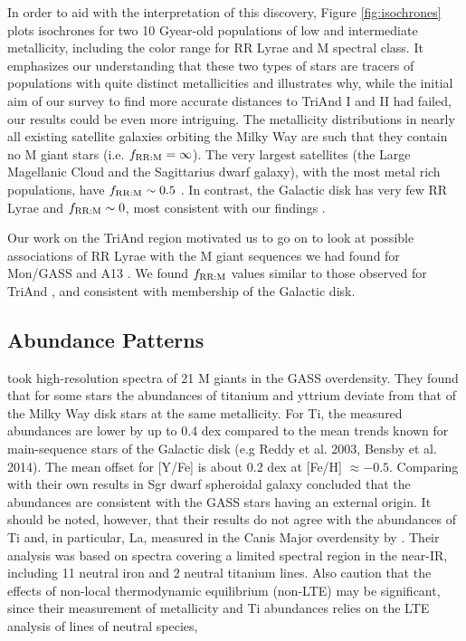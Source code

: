 \documentclass[galaxies,article,submit,moreauthors,pdftex,10pt,a4paper]{mdpi}
\begin{document}
In order to aid with the interpretation of this discovery, Figure \ref{fig:isochrones} plots isochrones for two 10 Gyear-old populations of low and intermediate metallicity, including the color range for RR Lyrae and M spectral class.
It emphasizes our understanding that these two types of stars are tracers of populations with quite distinct metallicities and illustrates why, while the initial aim of our survey to find more accurate distances to TriAnd I and II had failed, our results could be even more intriguing.
The metallicity distributions in nearly all existing satellite galaxies orbiting the Milky Way \citep[e.g.][]{kirby11} are such that they contain no M giant stars (i.e. $f_{\rm RR:M} = \infty$).
The very largest satellites (the Large Magellanic Cloud and the Sagittarius dwarf galaxy), with the most metal rich populations, have $f_{\rm RR:M}\sim 0.5$ \citep{pricewhelan15}.
In contrast, the Galactic disk has very few RR Lyrae and  $f_{\rm RR:M} \sim 0$, most consistent with our findings \citep{amrose01}.

Our work on the TriAnd region motivated us to go on to look at possible associations of RR Lyrae with the M giant sequences we had found for Mon/GASS and A13  \cite{sheffield17}.
We found $f_{\rm RR:M}$ values similar to those observed for TriAnd , and consistent with membership of the Galactic disk.


\subsection{Abundance Patterns}

\cite{chou2010b} took high-resolution spectra of 21 M giants in the GASS overdensity. They found that for some stars the abundances of titanium and yttrium deviate from that of the Milky Way disk stars at the same metallicity.  For Ti, the measured abundances are lower by up to 0.4 dex compared to the mean trends known for main-sequence stars of the Galactic disk (e.g Reddy et al. 2003, Bensby et al. 2014). The mean offset for [Y/Fe] is about 0.2 dex at [Fe/H] $\approx -0.5$. Comparing with their own results in Sgr dwarf spheroidal galaxy \citep{chou2010a} concluded that the abundances are consistent with the GASS stars having an external origin. It should be noted, however, that their results do not agree with the abundances of Ti and, in particular, La, measured in the Canis Major overdensity by \cite{sbordone2005}. Their analysis was based on spectra covering a limited spectral region in the near-IR, including 11 neutral iron and 2 neutral titanium lines. Also \cite{chou2010b} caution that the effects of non-local thermodynamic equilibrium (non-LTE) may be significant, since their measurement of metallicity and Ti abundances relies on the LTE analysis of lines of neutral species,
\end{document}
